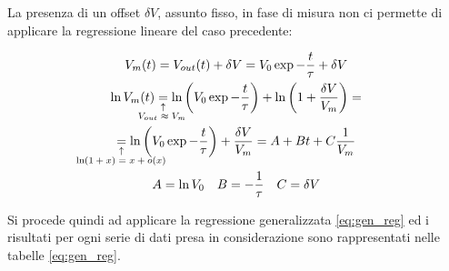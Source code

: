 \documentclass{article}
\newcommand{\equalexpl}[1]{
	\underset{\substack{\uparrow\\\mathrlap{\text{#1}}}}{=}}
\begin{document}
La presenza di un offset $\delta V$, assunto fisso, in fase di misura non ci permette di applicare la regressione lineare del caso precedente: 

\begin{gather}
	\nonumber
	V_m(t) = V_{out}(t) + \delta V =  V_0 \exp{ -\frac{t}{\tau} } + \delta V
	\\
	\nonumber
	\ln{V_m(t)} \equalexpl{\hspace{-2.5em}$V_{out} \approx V_m$} 
	\ln{\left( V_0 \exp{ -\frac{t}{\tau} } \right) } + 
	\ln{\left( 1 + \frac {\delta V}{V_{m}} \right) } = 
	\\
	\nonumber
	\equalexpl{\hspace{-4.5em}$\ln(1+x) = x + o(x)$} 
	\ln{\left( V_0 \exp{ -\frac{t}{\tau} } \right) } + 
	\frac {\delta V}{V_m} = A + B t + C\frac{1}{V_m}
	\\
	A = \ln{V_0} \quad B = -\frac{1}{\tau} \quad C = \delta V
	\label{eq:gen_reg}
\end{gather}  

Si procede quindi ad applicare la regressione generalizzata \ref{eq:gen_reg} ed i risultati per ogni serie di dati presa in considerazione sono rappresentati nelle tabelle \ref{eq:gen_reg}.
\end{document}
